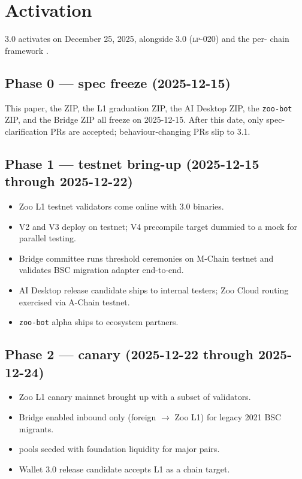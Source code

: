\section{Activation}
\label{sec:activation}

\Zoo{} 3.0 activates on December 25, 2025, alongside \Lux{}
\Quasar{} 3.0 (\textsc{lp-020}) and the per-\LLM{} chain framework
\cite{zoo-per-llm-chains}.

\subsection{Phase 0 --- spec freeze (2025-12-15)}

This paper, the \Zoo{} \DEX{} ZIP, the \Zoo{} L1 graduation ZIP, the
\Zoo{} AI Desktop ZIP, the \texttt{zoo-bot} ZIP, and the \Zoo{} Bridge
ZIP all freeze on 2025-12-15. After this date, only spec-clarification
PRs are accepted; behaviour-changing PRs slip to 3.1.

\subsection{Phase 1 --- testnet bring-up (2025-12-15 through 2025-12-22)}

\begin{itemize}[leftmargin=1.2em]
  \item Zoo L1 testnet validators come online with \Quasar{} 3.0
        binaries.
  \item \Zoo{} \DEX{} V2 and V3 deploy on testnet; V4 precompile
        target dummied to a mock \Lux{} \DEX{} for parallel testing.
  \item \Zoo{} Bridge committee runs threshold ceremonies on M-Chain
        testnet and validates BSC migration adapter end-to-end.
  \item \Zoo{} AI Desktop release candidate ships to internal testers;
        Zoo Cloud routing exercised via A-Chain testnet.
  \item \texttt{zoo-bot} alpha ships to ecosystem partners.
\end{itemize}

\subsection{Phase 2 --- canary (2025-12-22 through 2025-12-24)}

\begin{itemize}[leftmargin=1.2em]
  \item Zoo L1 canary mainnet brought up with a subset of validators.
  \item Bridge enabled inbound only (foreign $\rightarrow$ Zoo L1) for
        legacy 2021 BSC migrants.
  \item \Zoo{} \DEX{} pools seeded with foundation liquidity for major
        pairs.
  \item \Lux{} Wallet 3.0 release candidate accepts \Zoo{} L1 as a
        chain target.
\end{itemize}

